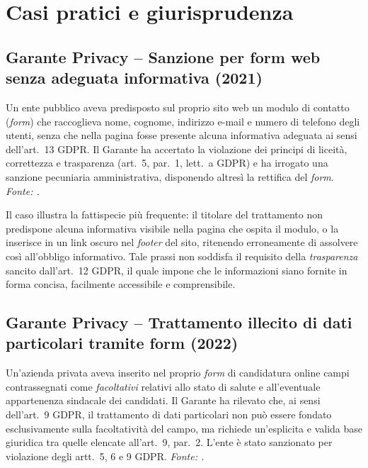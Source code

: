 \documentclass[12pt, a4paper]{article}
\begin{document}
\section{Casi pratici e giurisprudenza}
\label{sec:casipratici}

\subsection{Garante Privacy -- Sanzione per form web senza adeguata informativa (2021)}
\label{sub:garante2021}

\begin{sentenzabox}
  Un ente pubblico aveva predisposto sul proprio sito web un modulo di
  contatto (\emph{form}) che raccoglieva nome, cognome, indirizzo e-mail
  e numero di telefono degli utenti, senza che nella pagina fosse presente
  alcuna informativa adeguata ai sensi dell'art.~13 GDPR. Il Garante ha
  accertato la violazione dei principi di liceità, correttezza e trasparenza
  (art.~5, par.~1, lett.~a GDPR) e ha irrogato una sanzione pecuniaria
  amministrativa, disponendo altresì la rettifica del \emph{form}.
  \newline
  {\scriptsize \textit{Fonte: \autocite{garante2021_newsletter}.}}
\end{sentenzabox}

\medskip

Il caso illustra la fattispecie più frequente: il titolare
del trattamento non predispone alcuna informativa visibile nella pagina che
ospita il modulo, o la inserisce in un link oscuro nel \emph{footer} del sito,
ritenendo erroneamente di assolvere così all'obbligo informativo. Tale prassi
non soddisfa il requisito della \emph{trasparenza} sancito dall'art.~12 GDPR,
il quale impone che le informazioni siano fornite in forma concisa, facilmente
accessibile e comprensibile.

\subsection{Garante Privacy -- Trattamento illecito di dati particolari tramite form (2022)}
\label{sub:garante2022}

\begin{sentenzabox}
  Un'azienda privata aveva inserito nel proprio \emph{form} di candidatura
  online campi contrassegnati come \emph{facoltativi} relativi allo stato di
  salute e all'eventuale appartenenza sindacale dei candidati. Il Garante ha
  rilevato che, ai sensi dell'art.~9 GDPR, il trattamento di dati particolari
  non può essere fondato esclusivamente sulla facoltatività del campo, ma
  richiede un'esplicita e valida base giuridica tra quelle elencate all'art.~9,
  par.~2. L'ente è stato sanzionato per violazione degli artt.~5, 6 e 9 GDPR.
  \newline
  {\scriptsize \textit{Fonte: \autocite{garante2022_form}.}}
\end{sentenzabox}
\end{document}
